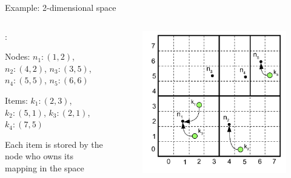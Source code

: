 \begin{frame}{Example: 2-dimensional space}

\begin{columns}
\begin{column}{0.5\textwidth}
:\\
\BI
\item Nodes: $n_1:(1, 2)$, $n_2:(4,2)$, $n_3:(3, 5)$, $n_4:(5,5)$, $n_5:(6,6)$
\item Items: $k_1:(2,3)$, $k_2:(5,1)$, $k_3:(2,1)$, $k_4:(7,5)$
\item Each item is stored by the node who owns its mapping in the space
\EI
\end{column}
\begin{column}{0.5\textwidth}
\begin{figure}
	\includegraphics[width=1.0\textwidth]{can5}
\end{figure}
\end{column}
\end{columns}
		
\end{frame}	

